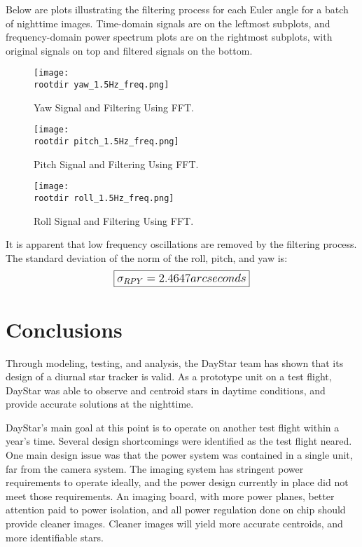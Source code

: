 \documentclass[twocolumn,letterpaper]{IEEEAerospace2012}
\newcommand{\rootdir}{./Figures/}
\begin{document}
Below are plots illustrating the filtering process for each Euler angle for a batch of nighttime images. Time-domain signals are on the leftmost subplots, and frequency-domain power spectrum plots are on the rightmost subplots, with original signals on top and filtered signals on the bottom.
\begin{figure*}
    \centering	
    \texttt{[image: \\rootdir yaw\_1.5Hz\_freq.png]}
    \caption{Yaw Signal and Filtering Using FFT.}
    \label{fig:Yaw Filtering}
\end{figure*}
\begin{figure*}
    \centering
    \texttt{[image: \\rootdir pitch\_1.5Hz\_freq.png]}
    \caption{Pitch Signal and Filtering Using FFT.}
    \label{fig:Pitch Filtering}
\end{figure*}
\begin{figure*}
    \centering
    \texttt{[image: \\rootdir roll\_1.5Hz\_freq.png]}
    \caption{Roll Signal and Filtering Using FFT.}
    \label{fig:Roll Filtering}
\end{figure*}

It is apparent that low frequency oscillations are removed by the filtering process. The standard deviation of the norm of the roll, pitch, and yaw is:
\begin{displaymath}\large
    \boxed{\sigma_{RPY} = 2.4647 arcseconds}
\end{displaymath}

\section{Conclusions}
Through modeling, testing, and analysis, the DayStar team has shown that its design of a diurnal star tracker is valid. As a prototype unit on a test flight, DayStar was able to observe and centroid stars in daytime conditions, and provide accurate solutions at the nighttime.

DayStar's main goal at this point is to operate on another test flight within a year's time. Several design shortcomings were identified as the test flight neared. One main design issue was that the power system was contained in a single unit, far from the camera system. The imaging system has stringent power requirements to operate ideally, and the power design currently in place did not meet those requirements. An imaging board, with more power planes, better attention paid to power isolation, and all power regulation done on chip should provide cleaner images. Cleaner images will yield more accurate centroids, and more identifiable stars.
\end{document}
